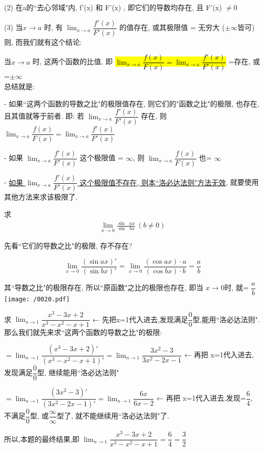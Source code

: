 \documentclass[UTF8]{ctexart}
\begin{document}
(2) 在a的``去心邻域"内,  f'(x) 和 F'(x) , 即它们的导数均存在, 且 F'(x) $\ne 0$

(3) 当$x \to a$ 时, 有 $\lim_{x \to a} \dfrac{f'(x)} {F'(x)}$ 的值存在, 或其极限值 = 无穷大 ($\pm \infty$皆可) \\

则, 而我们就有这个结论:

当$x \to a$ 时, 这两个函数的比值, 即 \hl{$\lim_{x \to a} \dfrac{f(x)} {F(x)} = \lim_{x \to a} \dfrac{f'(x)} {F'(x)}$} =存在, 或=$\pm \infty$ \\

总结就是:

- 如果``这两个函数的导数之比"的极限值存在, 则它们的"函数之比"的极限, 也存在, 且其值就等于前者.  即: 若 $\lim_{x \to a} \dfrac{f'(x)} {F'(x)} $ 存在, 则  $\lim_{x \to a} \dfrac{f(x)} {F(x)} = \lim_{x \to a} \dfrac{f'(x)} {F'(x)}$

- 如果 $\lim_{x \to a} \dfrac{f'(x)} {F'(x)} $ 这个极限值 = $\infty$, 则   $\lim_{x \to a} \dfrac{f(x)} {F(x)} $ 也= $\infty$

- \underline{如果 $\lim_{x \to a} \dfrac{f'(x)} {F'(x)} $ 这个极限值不存在, 则本``洛必达法则"方法无效}, 就要使用其他方法来求该极限了.


\begin{myEnvSample}
	求 \begin{align*}  %
		\lim_{x\rightarrow 0}\frac{\sin\text{\ }ax}{\sin\text{\ }bx}\ \left( b\ne 0 \right) 
	\end{align*}
	
	先看``它们的导数之比"的极限, 存不存在?
	
	$$
	\lim_{x\rightarrow 0}\frac{\left( \sin ax \right) '}{\left( \sin bx \right) '}=\lim_{x\rightarrow 0}\frac{\left( \cos ax \right) \cdot a}{\left( \cos bx \right) \cdot b}=\frac{a}{b}
	$$
	
	其``导数之比"的极限存在, 所以``原函数"之比的极限也存在, 即当 $x \to 0$时, 就= $\dfrac{a}{b}$ \\
	
	\texttt{[image: /0020.pdf]}
\end{myEnvSample}



\begin{myEnvSample}
	求 $\lim_{n\rightarrow 1}\dfrac{x^3-3x+2}{x^3-x^2-x+1}$  ← 先把x=1代入进去,发现满足$\dfrac{0}{0}$型,能用``洛必达法则". 那么我们就先来求``这两个函数的导数之比"的极限:
	
	$ =\lim_{n\rightarrow 1}\dfrac{\left( x^3-3x+2 \right) '}{\left( x^3-x^2-x+1 \right) '}=\lim_{n\rightarrow 1}\dfrac{3x^2-3}{3x^2-2x-1} $ ← 再把 x=1代入进去,发现满足$\dfrac{0}{0}$型, 继续能用``洛必达法则"
	
	$=\lim_{n\rightarrow 1}\dfrac{\left( 3x^2-3 \right) '}{\left( 3x^2-2x-1 \right) '}=\lim_{n\rightarrow 1}\dfrac{6x}{6x-2} $ ← 再把 x=1代入进去,发现=$\dfrac{6}{4}$, 不满足$\dfrac{0}{0}$型, 或$\dfrac{\infty}{\infty}$型了, 就不能继续用``洛必达法则"了.
	
	所以,本题的最终结果,即 $\lim_{n\rightarrow 1}\dfrac{x^3-3x+2}{x^3-x^2-x+1}=\dfrac{6}{4}=\dfrac{3}{2}$
\end{myEnvSample}  
\end{document}
